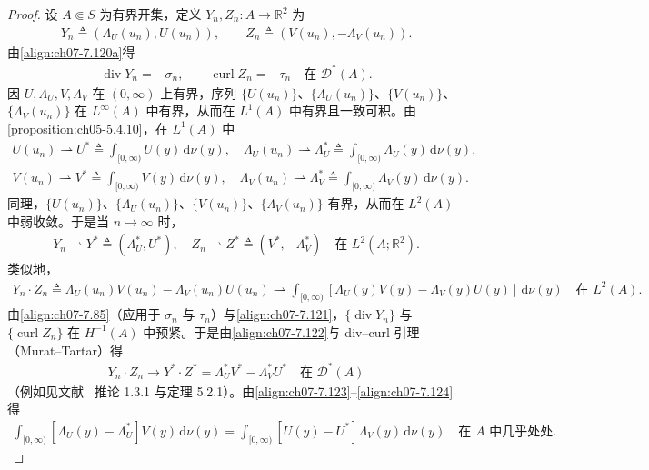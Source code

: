 \documentclass[../../main.tex]{subfiles}%
\begin{document}
\begin{proof}
设 $A\Subset S$ 为有界开集，定义 $Y_n,Z_n:A\to\mathbb{R}^2$ 为
\begin{align*}
Y_n\triangleq (\Lambda_U(u_n),U(u_n)),\qquad Z_n\triangleq (V(u_n),-\Lambda_V(u_n)).
\end{align*}
由\eqref{align:ch07-7.120a}得
\begin{align}
\operatorname{div}Y_n=-\sigma_n,\qquad \operatorname{curl}Z_n=-\tau_n\quad\text{在 }\mathcal{D}^*(A). \label{align:ch07-7.121}
\end{align}
因 $U,\Lambda_U,V,\Lambda_V$ 在 $(0,\infty)$ 上有界，序列 $\{U(u_n)\}$、$\{\Lambda_U(u_n)\}$、$\{V(u_n)\}$、$\{\Lambda_V(u_n)\}$ 在 $L^\infty(A)$ 中有界，从而在 $L^1(A)$ 中有界且一致可积。由\cref{proposition:ch05-5.4.10}，在 $L^1(A)$ 中
\begin{align*}
U(u_n)\rightharpoonup U^*\triangleq \int_{[0,\infty)}U(y)\,\mathrm{d}\nu(y),\quad
\Lambda_U(u_n)\rightharpoonup\Lambda_U^*\triangleq \int_{[0,\infty)}\Lambda_U(y)\,\mathrm{d}\nu(y),
\end{align*}
\begin{align*}
V(u_n)\rightharpoonup V^*\triangleq \int_{[0,\infty)}V(y)\,\mathrm{d}\nu(y),\quad
\Lambda_V(u_n)\rightharpoonup\Lambda_V^*\triangleq \int_{[0,\infty)}\Lambda_V(y)\,\mathrm{d}\nu(y).
\end{align*}
同理，$\{U(u_n)\}$、$\{\Lambda_U(u_n)\}$、$\{V(u_n)\}$、$\{\Lambda_V(u_n)\}$ 有界，从而在 $L^2(A)$ 中弱收敛。于是当 $n\to\infty$ 时，
\begin{align}
Y_n\rightharpoonup Y^*\triangleq (\Lambda_U^*,U^*),\quad
Z_n\rightharpoonup Z^*\triangleq (V^*,-\Lambda_V^*)\quad\text{在 }L^2(A;\mathbb{R}^2). \label{align:ch07-7.122}
\end{align}
类似地，
\begin{align}
Y_n\cdot Z_n\triangleq \Lambda_U(u_n)V(u_n)-\Lambda_V(u_n)U(u_n)
\rightharpoonup\int_{[0,\infty)}[\Lambda_U(y)V(y)-\Lambda_V(y)U(y)]\,\mathrm{d}\nu(y)
\quad\text{在 }L^2(A). \label{align:ch07-7.123}
\end{align}
由\eqref{align:ch07-7.85}（应用于 $\sigma_n$ 与 $\tau_n$）与\eqref{align:ch07-7.121}，$\{\operatorname{div}Y_n\}$ 与 $\{\operatorname{curl}Z_n\}$ 在 $H^{-1}(A)$ 中预紧。于是由\eqref{align:ch07-7.122}与 div--curl 引理（Murat--Tartar）得
\begin{align}
Y_n\cdot Z_n\to Y^*\cdot Z^*=\Lambda_U^*V^*-\Lambda_V^*U^*\quad\text{在 }\mathcal{D}^*(A) \label{align:ch07-7.124}
\end{align}
（例如见文献~\cite{ref46} 推论 1.3.1 与定理 5.2.1）。由\eqref{align:ch07-7.123}--\eqref{align:ch07-7.124}得
\begin{align}
\int_{[0,\infty)}[\Lambda_U(y)-\Lambda_U^*]V(y)\,\mathrm{d}\nu(y)
=\int_{[0,\infty)}[U(y)-U^*]\Lambda_V(y)\,\mathrm{d}\nu(y)
\quad\text{在 }A\text{ 中几乎处处}. \label{align:ch07-7.125}
\end{align}


\end{proof}
\end{document}
